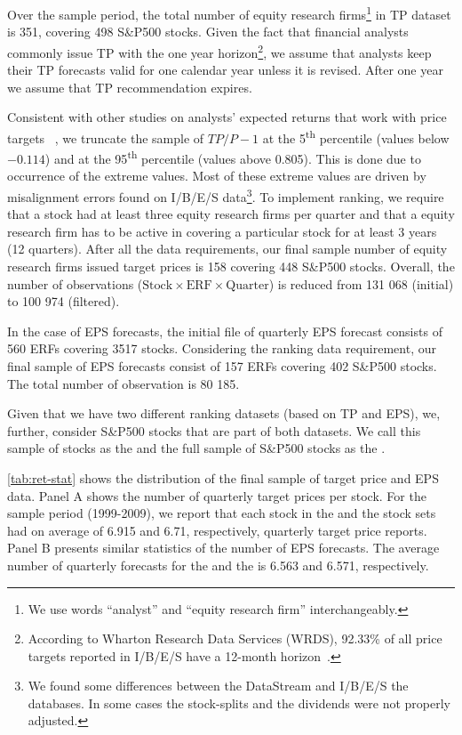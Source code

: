 \documentclass[a4paper,12pt,openright,notitlepage]{report}\usepackage[]{graphicx}\usepackage[]{color}
\begin{document}
Over the sample period, the total number of equity research firms\footnote{We use words ``analyst'' and ``equity research firm'' interchangeably.} in TP dataset is 351, covering 498 S\&P500 stocks. Given the fact that financial analysts commonly issue TP with the one year horizon\footnote{According to Wharton Research Data Services (WRDS), 92.33\% of all price targets reported in I/B/E/S have a 12-month horizon~\citep{glushkov2009}.}, we assume that analysts keep their TP forecasts valid for one calendar year unless it is revised. After one year we assume that TP recommendation expires.

Consistent with other studies on analysts' expected returns that work with price targets ~\citep{bradshaw2002,brav2003,da2011}, we truncate the sample of $TP/P-1$ at the 5\textsuperscript{th} percentile (values below \ensuremath{-0.114}) and at the 95\textsuperscript{th} percentile (values above 0.805). This is done due to occurrence of the extreme values. Most of these extreme values are driven by misalignment errors found on I/B/E/S data\footnote{We found some differences between the  DataStream and I/B/E/S the databases. In some cases the stock-splits and the dividends were not properly adjusted.}. To implement ranking, we require that a stock had at least three equity research firms per quarter and that a equity research firm has to be active in covering a particular stock for at least 3 years (12 quarters). After all the  data requirements, our final sample number of equity research firms issued target prices is 158 covering 448 S\&P500 stocks. Overall, the number of observations ($\mathrm{Stock} \times \mathrm{ERF} \times  \mathrm{Quarter}$) is reduced  from 131 068 (initial) to 100 974 (filtered).

In the case of EPS forecasts, the initial file of quarterly EPS forecast consists of 560 ERFs covering 3517 stocks. Considering the ranking data requirement, our final sample of EPS forecasts consist of  157 ERFs covering 402 S\&P500 stocks. The total number of observation is 80 185.


Given that we have two different ranking datasets (based on TP and EPS), we, further, consider S\&P500 stocks that are part of both datasets. We call this sample of stocks as the \same{} and the full sample of S\&P500 stocks as the \all{}.

\ref{tab:ret-stat} shows the distribution of the final sample of target price and EPS data. Panel A shows the number of quarterly target prices per stock. For the sample period (1999-2009), we report that each stock in the \same{} and the \all{} stock sets had on average of 6.915 and 6.71, respectively, quarterly target price reports. Panel B  presents similar statistics of the number of EPS forecasts. The average number of quarterly forecasts for the  \same{} and the \all{} is 6.563 and 6.571, respectively.
\end{document}
